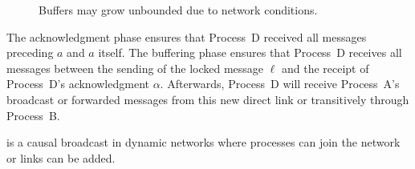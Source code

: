 \begin{figure*}
  \begin{center}
    \hspace{20pt}
    \hspace{20pt}
    \caption{\label{fig:bufferproblem}Buffers may grow unbounded due to network
      conditions.}
  \end{center}
\end{figure*}



The acknowledgment phase ensures that Process~D received all messages preceding
$a$ and $a$ itself. The buffering phase ensures that Process~D receives all
messages between the sending of the locked message $\ell$ and the receipt of
Process~D's acknowledgment $\alpha$. Afterwards, Process~D will receive
Process~A's broadcast or forwarded messages from this new direct link or
transitively through Process~B.

\begin{lemma}
  \CBROADCAST is a causal broadcast in dynamic networks where processes can join
  the network or links can be added.
\end{lemma}


